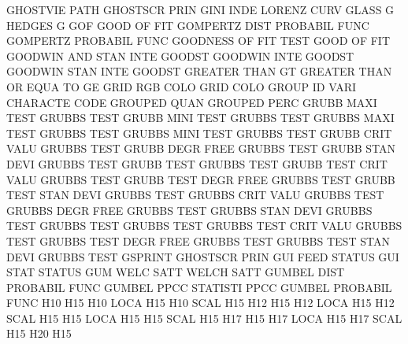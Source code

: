 GHOSTVIE PATH                           GHOSTSCR PRIN
GINI     INDE                           LORENZ   CURV
GLASS    G                              HEDGES   G
GOF                                     GOOD     OF   FIT
GOMPERTZ DIST                           PROBABIL FUNC
GOMPERTZ                                PROBABIL FUNC
GOODNESS OF   FIT  TEST                 GOOD     OF   FIT
GOODWIN  AND  STAN INTE                 GOODST
GOODWIN  INTE                           GOODST
GOODWIN  STAN INTE                      GOODST
GREATER  THAN                           GT
GREATER  THAN OR   EQUA TO              GE
GRID     RGB  COLO                      GRID     COLO
GROUP    ID   VARI                      CHARACTE CODE
GROUPED  QUAN                           GROUPED  PERC
GRUBB    MAXI TEST                      GRUBBS   TEST
GRUBB    MINI TEST                      GRUBBS   TEST
GRUBBS   MAXI TEST                      GRUBBS   TEST
GRUBBS   MINI TEST                      GRUBBS   TEST
GRUBB    CRIT VALU                      GRUBBS   TEST
GRUBB    DEGR FREE                      GRUBBS   TEST
GRUBB    STAN DEVI                      GRUBBS   TEST
GRUBB    TEST                           GRUBBS   TEST
GRUBB    TEST CRIT VALU                 GRUBBS   TEST
GRUBB    TEST DEGR FREE                 GRUBBS   TEST
GRUBB    TEST STAN DEVI                 GRUBBS   TEST
GRUBBS   CRIT VALU                      GRUBBS   TEST
GRUBBS   DEGR FREE                      GRUBBS   TEST
GRUBBS   STAN DEVI                      GRUBBS   TEST
GRUBBS   TEST                           GRUBBS   TEST
GRUBBS   TEST CRIT VALU                 GRUBBS   TEST
GRUBBS   TEST DEGR FREE                 GRUBBS   TEST
GRUBBS   TEST STAN DEVI                 GRUBBS   TEST
GSPRINT                                 GHOSTSCR PRIN
GUI      FEED                           STATUS
GUI      STAT                           STATUS
GUM      WELC SATT                      WELCH    SATT
GUMBEL   DIST                           PROBABIL FUNC
GUMBEL   PPCC                           STATISTI PPCC
GUMBEL                                  PROBABIL FUNC
H10                                     H15
H10      LOCA                           H15
H10      SCAL                           H15
H12                                     H15
H12      LOCA                           H15
H12      SCAL                           H15
H15      LOCA                           H15
H15      SCAL                           H15
H17                                     H15
H17      LOCA                           H15
H17      SCAL                           H15
H20                                     H15
